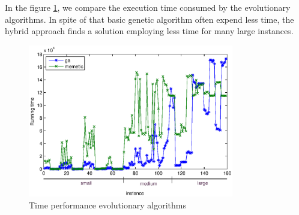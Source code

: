 In the figure \ref{fig:compare_times_evol}, we compare the execution time consumed by the evolutionary algorithms. In spite of that basic genetic algorithm often expend less time, the hybrid approach finds a solution employing less time for many large instances.


\begin{figure}[!htbp]
  \begin{center}
   \includegraphics[width=0.8\textwidth]{Images/Chapter5/compare_times_evol.eps}
  \end{center}
    \caption{Time performance evolutionary algorithms}\label{fig:compare_times_evol}
\end{figure}

